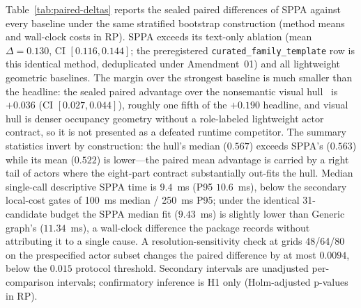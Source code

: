 \documentclass[11pt,a4paper]{article}
\begin{document}
Table~\ref{tab:paired-deltas} reports the sealed paired
differences of SPPA against every baseline under the same stratified
bootstrap construction (method means and wall-clock costs in
RP). SPPA exceeds its text-only ablation (mean
\(\Delta=0.130\), CI \([0.116,0.144]\); the preregistered
\texttt{curated\_family\_template} row is this identical method,
deduplicated under Amendment~01) and all lightweight geometric baselines. The margin over the
strongest baseline is much smaller than the headline: the sealed paired
advantage over the nonsemantic visual hull~\cite{laurentini1994visual} is
\(+0.036\) (CI \([0.027,0.044]\)), roughly one fifth of the \(+0.190\)
headline, and visual hull is denser occupancy geometry without a
role-labeled lightweight actor contract, so it is not presented as a
defeated runtime competitor. The summary statistics invert by construction:
the hull's median (\(0.567\)) exceeds SPPA's (\(0.563\)) while its
mean (\(0.522\)) is lower---the paired mean
advantage is carried by a right tail of actors where the eight-part
contract substantially out-fits the hull. Median single-call descriptive
SPPA time is \(9.4\)~ms (P95 \(10.6\)~ms), below the secondary
local-cost gates of 100~ms median / 250~ms P95; under the identical
31-candidate budget the SPPA median fit (\(9.43\)~ms) is slightly
lower than Generic graph's (\(11.34\)~ms), a wall-clock difference the
package records without attributing it to a single cause. A
resolution-sensitivity check
at grids 48/64/80 on the prespecified actor subset changes the paired
difference by at most \(0.0094\), below the \(0.015\) protocol threshold.
Secondary intervals are unadjusted per-comparison intervals; confirmatory
inference is H1 only (Holm-adjusted p-values in RP).

\begin{table}[!htb]
\centering
\footnotesize
\caption{Sealed paired differences of SPPA against every baseline on
the held-out test (clean 64-cubed voxel IoU, \(n{=}240\), stratified
bootstrap, 10{,}000 resamples, seed 77157; all deltas sealed in
\texttt{confirmatory\_summary.json}). Means and medians are recomputed
read-only from the sealed \texttt{raw\_metrics.csv}. Row labels are display
aliases for the preregistered protocol arms \texttt{sppa\_mvfit},
\texttt{sppa\_text\_only}, and \texttt{generic\_mvfit}. Deltas are per-actor
paired means and need not equal differences of the displayed rounded means.}
\label{tab:paired-deltas}

\end{table}
\end{document}

